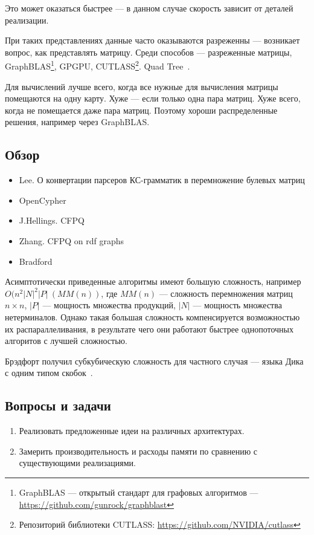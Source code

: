 Это может оказаться быстрее --- в данном случае скорость зависит от деталей реализации.

При таких представлениях данные часто оказываются разреженны --- возникает вопрос, как представлять матрицу. Среди способов --- разреженные матрицы, GraphBLAS\footnote{GraphBLAS --- открытый стандарт для графовых алгоритмов --- \url{https://github.com/gunrock/graphblast} }, GPGPU, CUTLASS\footnote{Репозиторий библиотеки CUTLASS: \url{https://github.com/NVIDIA/cutlass}}.
Quad Tree~\cite{quadtree}.

Для вычислений лучше всего, когда все нужные для вычисления матрицы помещаются на одну карту. Хуже --- если только одна пара матриц. Хуже всего, когда не помещается даже пара матриц. Поэтому хороши распределенные решения, например через GraphBLAS.

\subsection{Обзор}
\begin{itemize}
	\item Lee. О конвертации парсеров КС-грамматик в перемножение булевых матриц~\cite{Lee:2002:FCG:505241.505242}
	\item OpenCypher~\cite{Kuijpers:2019:ESC:3335783.3335791}
	\item J.Hellings. CFPQ~\cite{hellingsRelational,hellings2015querying,Hellings2015PathRF}
	\item Zhang. CFPQ on rdf graphs~\cite{10.1007/978-3-319-46523-4_38}
	\item Bradford~\cite{bradford2007quickest,ward2008distributed,bradford2016fast,Bradford:2008:LCG:1373936.1373946}
\end{itemize}

Асимптотически приведенные алгоритмы имеют большую сложность, например \\ $O(n^2 |N|^2|P|~ (MM(n))$, где $MM(n)$ --- сложность перемножения матриц $n \times n$, $|P|$ --- мощность множества продукций, $|N|$ --- мощность множества нетерминалов. Однако такая большая сложность компенсируется возможностью их распараллеливания, в результате чего они работают быстрее однопоточных алгоритов с лучшей сложностью.

Брэдфорт получил субкубическую сложность для частного случая --- языка Дика с одним типом скобок~\cite{8249039}.

\subsection{Вопросы и задачи}
\begin{enumerate}
  \item Реализовать предложенные идеи на различных архитектурах.
  \item Замерить производительность и расходы памяти по сравнению с существующими реализациями.
\end{enumerate}
